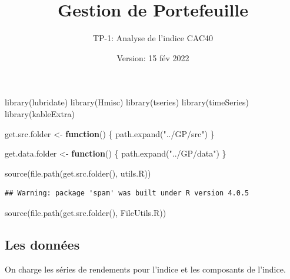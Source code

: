 \documentclass[
]{article}
\title{Gestion de Portefeuille}
\subtitle{TP-1: Analyse de l'indice CAC40}
\author{}
\date{\vspace{-2.5em}Version: 15 fév 2022}
\newenvironment{Shaded}{\begin{snugshade}}{\end{snugshade}}
\newcommand{\ControlFlowTok}[1]{\textcolor[rgb]{0.13,0.29,0.53}{\textbf{#1}}}
\newcommand{\FunctionTok}[1]{\textcolor[rgb]{0.00,0.00,0.00}{#1}}
\newcommand{\NormalTok}[1]{#1}
\newcommand{\OtherTok}[1]{\textcolor[rgb]{0.56,0.35,0.01}{#1}}
\newcommand{\StringTok}[1]{\textcolor[rgb]{0.31,0.60,0.02}{#1}}
\begin{document}
\maketitle

\begin{Shaded}
\begin{Highlighting}[]
\FunctionTok{library}\NormalTok{(lubridate)}
\FunctionTok{library}\NormalTok{(Hmisc)}
\FunctionTok{library}\NormalTok{(tseries)}
\FunctionTok{library}\NormalTok{(timeSeries)}
\FunctionTok{library}\NormalTok{(kableExtra)}


\NormalTok{get.src.folder }\OtherTok{\textless{}{-}} \ControlFlowTok{function}\NormalTok{() \{}
  \FunctionTok{path.expand}\NormalTok{(}\StringTok{"../GP/src"}\NormalTok{)}
\NormalTok{\}}

\NormalTok{get.data.folder }\OtherTok{\textless{}{-}} \ControlFlowTok{function}\NormalTok{() \{}
  \FunctionTok{path.expand}\NormalTok{(}\StringTok{"../GP/data"}\NormalTok{)}
\NormalTok{\}}

\FunctionTok{source}\NormalTok{(}\FunctionTok{file.path}\NormalTok{(}\FunctionTok{get.src.folder}\NormalTok{(), }\StringTok{\textquotesingle{}utils.R\textquotesingle{}}\NormalTok{))}
\end{Highlighting}
\end{Shaded}

\begin{verbatim}
## Warning: package 'spam' was built under R version 4.0.5
\end{verbatim}

\begin{Shaded}
\begin{Highlighting}[]
\FunctionTok{source}\NormalTok{(}\FunctionTok{file.path}\NormalTok{(}\FunctionTok{get.src.folder}\NormalTok{(), }\StringTok{\textquotesingle{}FileUtils.R\textquotesingle{}}\NormalTok{))}
\end{Highlighting}
\end{Shaded}

\hypertarget{les-donnuxe9es}{%
\subsection{Les données}\label{les-donnuxe9es}}

On charge les séries de rendements pour l'indice et les composants de
l'indice.
\end{document}
